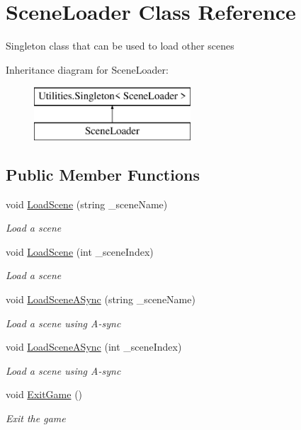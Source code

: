 \hypertarget{class_scene_loader}{}\section{Scene\+Loader Class Reference}
\label{class_scene_loader}


Singleton class that can be used to load other scenes  


Inheritance diagram for Scene\+Loader\+:\begin{figure}[H]
\begin{center}
\leavevmode
\includegraphics[height=2.000000cm]{class_scene_loader}
\end{center}
\end{figure}
\subsection*{Public Member Functions}
\begin{DoxyCompactItemize}
\item 
void \mbox{\hyperlink{class_scene_loader_a163293de6da9b9a1fd0f0814dec77973}{Load\+Scene}} (string \+\_\+scene\+Name)
\begin{DoxyCompactList}\small\item\em Load a scene \end{DoxyCompactList}\item 
void \mbox{\hyperlink{class_scene_loader_a13020def59e988030b5a019fe31baaa3}{Load\+Scene}} (int \+\_\+scene\+Index)
\begin{DoxyCompactList}\small\item\em Load a scene \end{DoxyCompactList}\item 
void \mbox{\hyperlink{class_scene_loader_ae19ae9a4206c64852c9538d0671dbe96}{Load\+Scene\+A\+Sync}} (string \+\_\+scene\+Name)
\begin{DoxyCompactList}\small\item\em Load a scene using A-\/sync \end{DoxyCompactList}\item 
void \mbox{\hyperlink{class_scene_loader_a13e9697bd4f96b57e215d179b85767f5}{Load\+Scene\+A\+Sync}} (int \+\_\+scene\+Index)
\begin{DoxyCompactList}\small\item\em Load a scene using A-\/sync \end{DoxyCompactList}\item 
void \mbox{\hyperlink{class_scene_loader_a0e53114fa65d1ef71d1c6af0bcb4fde5}{Exit\+Game}} ()
\begin{DoxyCompactList}\small\item\em Exit the game \end{DoxyCompactList}\end{DoxyCompactItemize}

